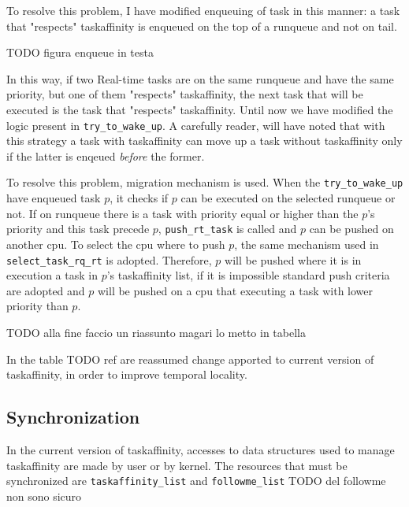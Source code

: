 To resolve this problem, I have modified enqueuing of task in this manner: a task that "respects" taskaffinity is enqueued on the top of a runqueue and not 
on tail. 

TODO figura enqueue in testa

In this way, if two Real-time tasks are on the same runqueue and have the same priority, but one of them "respects" taskaffinity, the next task that 
will be executed is the task that "respects" taskaffinity. Until now we have modified the logic present in \texttt{try\_to\_wake\_up}.
A carefully reader, will have noted that with this strategy a task with taskaffinity can move up a task without taskaffinity only if the latter is enqeued 
\textit{before} the former.

To resolve this problem, migration mechanism is used. When the \texttt{try\_to\_wake\_up} have enqueued task $p$, it checks if $p$  can be executed on the 
selected runqueue or not. If on runqueue there is a task with priority equal or higher than the $p$'s priority and this task precede $p$, 
\texttt{push\_rt\_task} is called and $p$ can be pushed on another cpu. To select the cpu where to push $p$, the same mechanism used in 
\texttt{select\_task\_rq\_rt} is adopted. Therefore, $p$ will be pushed where it is in execution a task in $p$'s taskaffinity list, if it is impossible
standard push criteria are adopted and $p$ will be pushed on a cpu that executing a task with lower priority than $p$.

TODO alla fine faccio un riassunto magari lo metto in tabella

In the table TODO ref are reassumed change apported to current version of taskaffinity, in order to improve temporal locality.

\subsection{Synchronization}

In the current version of taskaffinity, accesses to data structures used to manage taskaffinity are made by user or by kernel. The resources that must be
synchronized are \texttt{taskaffinity\_list} and \texttt{followme\_list} TODO del followme non sono sicuro

